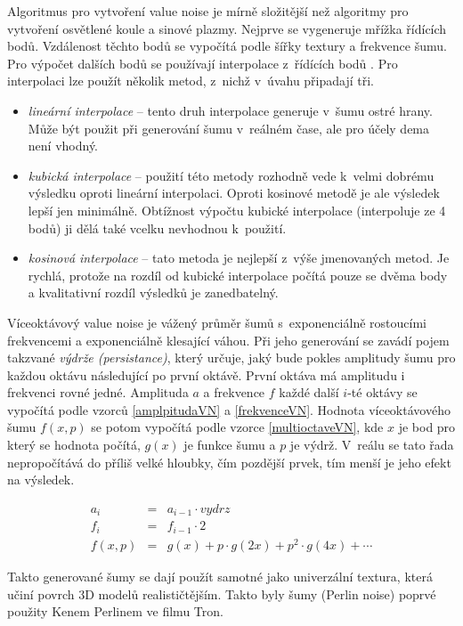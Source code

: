 Algoritmus pro vytvoření value noise je mírně složitější než algoritmy pro vytvoření osvětlené koule a sinové plazmy.
Nejprve se vygeneruje mřížka řídících bodů.
Vzdálenost těchto bodů se vypočítá podle šířky textury a frekvence šumu.
Pro výpočet dalších bodů se používají interpolace z~řídících bodů \cite{noise}.
Pro interpolaci lze použít několik metod, z~nichž v~úvahu připadají tři.
\begin{itemize}
  \item \emph{lineární interpolace}  -- tento druh interpolace generuje v~šumu ostré hrany. Může být použit při generování šumu v~reálném čase, ale pro účely dema není vhodný.
  \item \emph{kubická interpolace} -- použití této metody rozhodně vede k~velmi dobrému výsledku oproti lineární interpolaci. Oproti kosinové metodě je ale výsledek lepší jen minimálně. Obtížnost výpočtu kubické interpolace (interpoluje ze 4 bodů) ji dělá také vcelku nevhodnou k~použití.  
  \item \emph{kosinová interpolace} -- tato metoda je nejlepší z~výše jmenovaných metod. Je rychlá, protože na rozdíl od kubické interpolace počítá pouze se dvěma body a kvalitativní rozdíl výsledků je zanedbatelný.
\end{itemize}

Víceoktávový value noise je vážený průměr šumů s~exponenciálně rostoucími frekvencemi a exponenciálně klesající váhou.
Při jeho generování se zavádí pojem takzvané \emph{výdrže (persistance)}, který určuje, jaký bude pokles amplitudy šumu pro každou oktávu následující po první oktávě.
První oktáva má amplitudu i frekvenci rovné jedné.
Amplituda $a$ a frekvence $f$ každé další $i$-té oktávy se vypočítá podle vzorců \ref{amplpitudaVN} a \ref{frekvenceVN}.
Hodnota víceoktávového šumu $f(x,p)$ se potom vypočítá podle vzorce \ref{multioctaveVN}, kde $x$ je bod pro který se hodnota počítá, $g(x)$ je funkce šumu a $p$ je výdrž.
V~reálu se tato řada nepropočítává do příliš velké hloubky, čím pozdější prvek, tím menší je jeho efekt na výsledek.

\begin{eqnarray}
  a_i & = & a_{i - 1} \cdot vydrz \label{amplpitudaVN} \\ 
  f_i & = & f_{i - 1} \cdot 2 \label{frekvenceVN} \\
  f(x,p) & = & g(x) + p \cdot g(2x) + p^2 \cdot g(4x) + \cdots \label{multioctaveVN}
\end{eqnarray}

Takto generované šumy se dají použít samotné jako univerzální textura, která učiní povrch 3D modelů realističtějším.
Takto byly šumy (Perlin noise) poprvé použity Kenem Perlinem ve filmu Tron.

